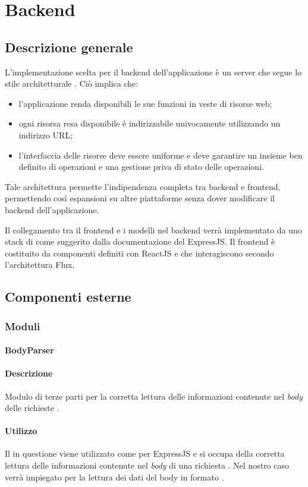 \section{Backend}
\subsection{Descrizione generale}
L'implementazione scelta per il backend dell'applicazione è un server che segue lo stile architetturale . Ciò implica che:
\begin{itemize}
\item l'applicazione renda disponibili le sue funzioni in veste di risorse web;
\item ogni risorsa resa disponibile è indirizzabile univocamente utilizzando un indirizzo URL;
\item l'interfaccia delle risorse deve essere uniforme e deve garantire un insieme ben definito di operazioni e una gestione priva di stato delle operazioni.
\end{itemize}

Tale architettura permette l'indipendenza completa tra backend e frontend, permettendo così espansioni su altre piattaforme senza dover modificare il backend dell'applicazione.

Il collegamento tra il frontend e i modelli nel backend verrà implementato da uno stack di  come suggerito dalla documentazione del  ExpressJS. Il frontend è costituito da componenti definiti con ReactJS e che interagiscono secondo l'architettura Flux.

\subsection{Componenti esterne}
\subsubsection{Moduli}
\paragraph{BodyParser}
\paragraph*{Descrizione}
Modulo di terze parti per la corretta lettura delle informazioni contenute nel \textit{body} delle richieste .

\paragraph*{Utilizzo}
Il  in questione viene utilizzato come  per ExpressJS e si occupa della corretta lettura delle informazioni contenute nel \textit{body} di una richiesta . Nel nostro caso verrà impiegato per la lettura dei dati del body in formato .

